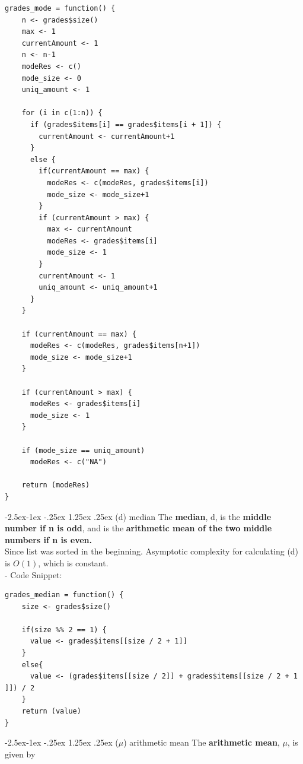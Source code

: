 \documentclass[11pt]{article}
\makeatletter
\renewcommand\paragraph{\@startsection{paragraph}{4}{\z@}%
            {-2.5ex\@plus -1ex \@minus -.25ex}%
            {1.25ex \@plus .25ex}%
            {\normalfont\normalsize\bfseries}}
\makeatother
\begin{document}
\begin{lstlisting}
grades_mode = function() {
    n <- grades$size()
    max <- 1
    currentAmount <- 1
    n <- n-1
    modeRes <- c()
    mode_size <- 0
    uniq_amount <- 1
    
    for (i in c(1:n)) {
      if (grades$items[i] == grades$items[i + 1]) {
        currentAmount <- currentAmount+1
      }
      else {
        if(currentAmount == max) {
          modeRes <- c(modeRes, grades$items[i])
          mode_size <- mode_size+1
        }
        if (currentAmount > max) {
          max <- currentAmount
          modeRes <- grades$items[i]
          mode_size <- 1
        }
        currentAmount <- 1
        uniq_amount <- uniq_amount+1
      }
    }
    
    if (currentAmount == max) {
      modeRes <- c(modeRes, grades$items[n+1])
      mode_size <- mode_size+1
    }
    
    if (currentAmount > max) {
      modeRes <- grades$items[i]
      mode_size <- 1
    }
    
    if (mode_size == uniq_amount)
      modeRes <- c("NA")
    
    return (modeRes)
}
\end{lstlisting}

\paragraph{(d) median}
The \textbf{median}, d, is the \textbf{middle number if n is odd}, and is the \textbf{arithmetic mean of the two middle numbers if n is even.}\\

Since list was sorted in the beginning. Asymptotic complexity for calculating (d) is $O(1)$, which is constant.\\

- Code Snippet:\\

\begin{lstlisting}
grades_median = function() {
    size <- grades$size()
    
    if(size %% 2 == 1) {
      value <- grades$items[[size / 2 + 1]]
    }
    else{
      value <- (grades$items[[size / 2]] + grades$items[[size / 2 + 1 ]]) / 2
    }
    return (value)
}
\end{lstlisting}

\paragraph{(\texorpdfstring{$\mu$}{u}) arithmetic mean}
The \textbf{arithmetic mean}, $\mu$, is given by
\end{document}
